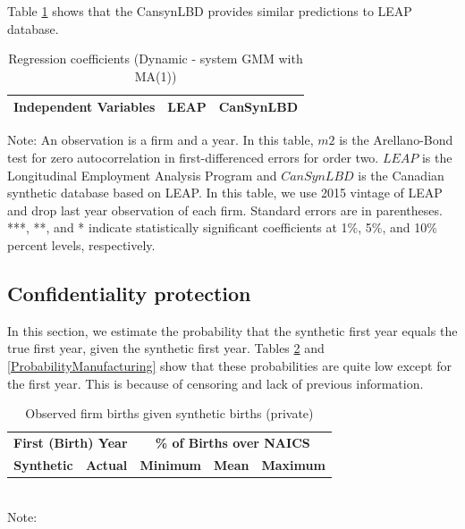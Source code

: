\documentclass{article}
\begin{document}
Table \ref{Dynamic - system GMM with MA(1)} shows that the CansynLBD provides similar predictions to LEAP database.

\begin{table}[H]
  \centering
\begin{threeparttable}
 \caption{Regression coefficients (Dynamic - system GMM with MA(1))} \label{Dynamic - system GMM with MA(1)} \medskip
\renewcommand{\arraystretch}{1}
\begin{tabular}{l|c c| c c}
\toprule
\textbf{Independent Variables}&\multicolumn{2}{c|}{\textbf{LEAP}} &  \multicolumn{2}{c}{\textbf{CanSynLBD}}\\
\midrule

   \bottomrule
  \end{tabular} 
\begin{tablenotes}
\small
\item Note: An observation is a firm and a year. In this table, $m2$ is the Arellano-Bond test for zero autocorrelation in first-differenced errors for order two. $LEAP$ is the Longitudinal Employment Analysis Program and $CanSynLBD$ is the Canadian synthetic database based on LEAP. In this table, we use 2015 vintage of LEAP and drop last year observation of each firm. Standard errors are in parentheses. ***, **, and * indicate statistically significant coefficients at 1\%, 5\%, and 10\% percent levels, respectively.
 \end{tablenotes}
 \end{threeparttable}
\end{table}

\newpage
\subsection{Confidentiality protection}
In this section, we estimate the probability that the synthetic first year equals the true first year, given the synthetic first year. Tables \ref{ProbabilityPrivate} and \ref{ProbabilityManufacturing} show that these probabilities are quite low except for the first year. This is because of censoring and lack of previous information.

\begin{table}[H]
\centering\footnotesize
\caption{Observed firm births given synthetic births (private)} \label{ProbabilityPrivate} \medskip
\renewcommand{\arraystretch}{1}
\begin{tabular}{c c| c c c}
\toprule
\multicolumn{2}{c|}{\textbf{First (Birth) Year}} &  \multicolumn{3}{c}{\textbf{\% of Births over NAICS}}\\
\textbf{Synthetic}&\textbf{Actual}&\textbf{Minimum}&\textbf{Mean}&\textbf{Maximum}\\
\midrule

\bottomrule
\end{tabular} 
\\
\justify
Note:
\end{table}
\end{document}
